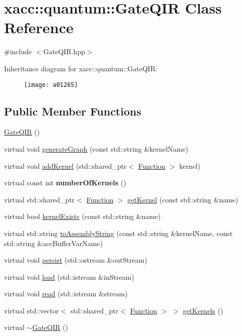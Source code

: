 \hypertarget{a01265}{}\section{xacc\+:\+:quantum\+:\+:Gate\+Q\+IR Class Reference}
\label{a01265}


{\ttfamily \#include $<$Gate\+Q\+I\+R.\+hpp$>$}

Inheritance diagram for xacc\+:\+:quantum\+:\+:Gate\+Q\+IR\+:\begin{figure}[H]
\begin{center}
\leavevmode
\texttt{[image: a01265]}
\end{center}
\end{figure}
\subsection*{Public Member Functions}
\begin{DoxyCompactItemize}
\item 
\hyperlink{a01265_afb99f610a6b123538c659169c131a634}{Gate\+Q\+IR} ()
\item 
virtual void \hyperlink{a01265_ad1ddd6105346dd9fc78648fd812285ed}{generate\+Graph} (const std\+::string \&kernel\+Name)
\item 
virtual void \hyperlink{a01265_aa6ed2cf2cbcfec8105c327a4fa95346f}{add\+Kernel} (std\+::shared\+\_\+ptr$<$ \hyperlink{a01653}{Function} $>$ kernel)
\item 
\mbox{\label{a01265_aca6be85526b14f500e7f98954dd6da5c}} 
virtual const int {\bfseries number\+Of\+Kernels} ()
\item 
virtual std\+::shared\+\_\+ptr$<$ \hyperlink{a01653}{Function} $>$ \hyperlink{a01265_a194758b6edcc3ae0c7fe8004f9bfe690}{get\+Kernel} (const std\+::string \&name)
\item 
virtual bool \hyperlink{a01265_a692f95099caa7c024110a3f035941dca}{kernel\+Exists} (const std\+::string \&name)
\item 
virtual std\+::string \hyperlink{a01265_a7153f7e9f516d43af3d5d4f95d60bd86}{to\+Assembly\+String} (const std\+::string \&kernel\+Name, const std\+::string \&acc\+Buffer\+Var\+Name)
\item 
virtual void \hyperlink{a01265_a40e1d07e4dfd3794ef53fca3cdbdca61}{persist} (std\+::ostream \&out\+Stream)
\item 
virtual void \hyperlink{a01265_a07f26eeb362ac480d20da6cdc8c8fb39}{load} (std\+::istream \&in\+Stream)
\item 
virtual void \hyperlink{a01265_a26019e2f1e13e64645e29aee86ac58b1}{read} (std\+::istream \&stream)
\item 
virtual std\+::vector$<$ std\+::shared\+\_\+ptr$<$ \hyperlink{a01653}{Function} $>$ $>$ \hyperlink{a01265_a4ace7ee5ebef84b1f39aaf5ed12c6cc6}{get\+Kernels} ()
\item 
virtual \hyperlink{a01265_ac88db03f1dd29e2d36aaa6c01a130008}{$\sim$\+Gate\+Q\+IR} ()
\end{DoxyCompactItemize}
